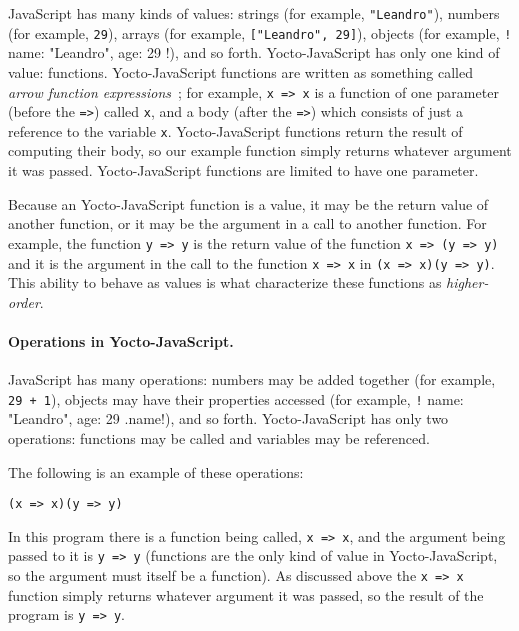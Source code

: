 \documentclass[12pt, oneside]{book}
\begin{document}
JavaScript has many kinds of values: strings (for example, \texttt{"Leandro"}), numbers (for example, \texttt{29}), arrays (for example, \texttt{["Leandro", 29]}), objects (for example, \texttt!{ name: "Leandro", age: 29 }!), and so forth. Yocto-JavaScript has only one kind of value: functions. Yocto-JavaScript functions are written as something called \emph{arrow function expressions}~\cite{arrow-function-expressions}; for example, \texttt{x => x} is a function of one parameter (before the \texttt{=>}) called \texttt{x}, and a body (after the \texttt{=>}) which consists of just a reference to the variable \texttt{x}. Yocto-JavaScript functions return the result of computing their body, so our example function simply returns whatever argument it was passed. Yocto-JavaScript functions are limited to have one parameter.

Because an Yocto-JavaScript function is a value, it may be the return value of another function, or it may be the argument in a call to another function. For example, the function \texttt{y => y} is the return value of the function \texttt{x => (y => y)} and it is the argument in the call to the function \texttt{x => x} in \texttt{(x => x)(y => y)}. This ability to behave as values is what characterize these functions as \emph{higher-order}.

\paragraph{Operations in Yocto-JavaScript.}

JavaScript has many operations: numbers may be added together (for example, \texttt{29 + 1}), objects may have their properties accessed (for example, \texttt!{ name: "Leandro", age: 29 }.name!), and so forth. Yocto-JavaScript has only two operations: functions may be called and variables may be referenced.

The following is an example of these operations:

\begin{verbatim}
(x => x)(y => y)
\end{verbatim}

In this program there is a function being called, \texttt{x => x}, and the argument being passed to it is \texttt{y => y} (functions are the only kind of value in Yocto-JavaScript, so the argument must itself be a function). As discussed above the \texttt{x => x} function simply returns whatever argument it was passed, so the result of the program is \texttt{y => y}.
\end{document}
